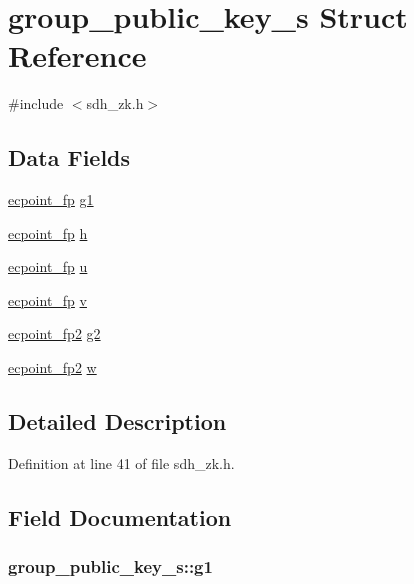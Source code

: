 \hypertarget{structgroup__public__key__s}{\section{group\-\_\-public\-\_\-key\-\_\-s Struct Reference}
\label{structgroup__public__key__s}
}


{\ttfamily \#include $<$sdh\-\_\-zk.\-h$>$}

\subsection*{Data Fields}
\begin{DoxyCompactItemize}
\item 
\hyperlink{structecpoint__fp}{ecpoint\-\_\-fp} \hyperlink{structgroup__public__key__s_a380d215bcbececcd82e98588d58a5eba}{g1}
\item 
\hyperlink{structecpoint__fp}{ecpoint\-\_\-fp} \hyperlink{structgroup__public__key__s_a470bf1df131a6f861f4439e52e49f349}{h}
\item 
\hyperlink{structecpoint__fp}{ecpoint\-\_\-fp} \hyperlink{structgroup__public__key__s_afe10241d021cdf5ff24d9827f82e3795}{u}
\item 
\hyperlink{structecpoint__fp}{ecpoint\-\_\-fp} \hyperlink{structgroup__public__key__s_a1f7c91c70559dd48762edce94bab9dfd}{v}
\item 
\hyperlink{structecpoint__fp2}{ecpoint\-\_\-fp2} \hyperlink{structgroup__public__key__s_ac406c0993076bb75cef25c68ca755330}{g2}
\item 
\hyperlink{structecpoint__fp2}{ecpoint\-\_\-fp2} \hyperlink{structgroup__public__key__s_aca44fbfefe4770940dfd03a6fb1a365f}{w}
\end{DoxyCompactItemize}


\subsection{Detailed Description}


Definition at line 41 of file sdh\-\_\-zk.\-h.



\subsection{Field Documentation}
\hypertarget{structgroup__public__key__s_a380d215bcbececcd82e98588d58a5eba}{
\subsubsection[{g1}]{ group\-\_\-public\-\_\-key\-\_\-s\-::g1}}\label{structgroup__public__key__s_a380d215bcbececcd82e98588d58a5eba}



